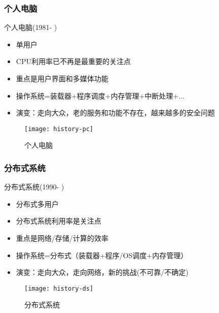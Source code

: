 \begin{frame}[plain]
	
	\frametitle{个人电脑}
	
	个人电脑(1981- )
	\begin{itemize}
		\item 单用户
		\item CPU利用率已不再是最重要的关注点	
		\item 重点是用户界面和多媒体功能
		\item 操作系统=装载器+程序调度+内存管理+中断处理+...
		\item 演变：走向大众，老的服务和功能不存在，越来越多的安全问题
	\end{itemize}
	
	\begin{figure}
		\centering
		\texttt{[image: history-pc]}
		\caption{个人电脑}
	\end{figure}
	
\end{frame}



\begin{frame}[plain]
	
	\frametitle{分布式系统}
	
	分布式系统(1990- )

	\begin{itemize}
		\item 分布式多用户
		\item 分布式系统利用率是关注点	
		\item 重点是网络/存储/计算的效率
		\item 操作系统=分布式（装载器+程序/OS调度+内存管理）
		\item 演变：走向大众，走向网络，新的挑战(不可靠/不确定)
	\end{itemize}
	
	\begin{figure}
		\centering
		\texttt{[image: history-ds]}
		\caption{分布式系统}
	\end{figure}
	
\end{frame}

